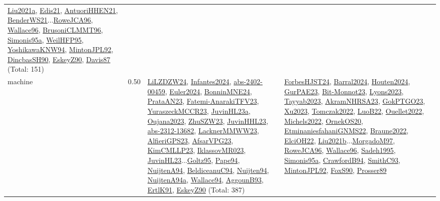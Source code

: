 {\begin{longtable}{p{3cm}r>{\raggedright\arraybackslash}p{6cm}>{\raggedright\arraybackslash}p{6cm}>{\raggedright\arraybackslash}p{8cm}}
\hyperref[detail:Liu2021a]{Liu2021a}, \hyperref[detail:Edis21]{Edis21}, \hyperref[detail:AntuoriHHEN21]{AntuoriHHEN21}, \hyperref[detail:BenderWS21]{BenderWS21}...\hyperref[detail:RoweJCA96]{RoweJCA96}, \hyperref[detail:Wallace96]{Wallace96}, \hyperref[detail:BrusoniCLMMT96]{BrusoniCLMMT96}, \hyperref[detail:Simonis95a]{Simonis95a}, \hyperref[detail:WeilHFP95]{WeilHFP95}, \hyperref[detail:YoshikawaKNW94]{YoshikawaKNW94}, \hyperref[detail:MintonJPL92]{MintonJPL92}, \hyperref[detail:DincbasSH90]{DincbasSH90}, \hyperref[detail:EskeyZ90]{EskeyZ90}, \hyperref[detail:Davis87]{Davis87} (Total: 151)\\
\index{machine}\index{Scheduling!machine}machine &  0.50 & \hyperref[detail:LiLZDZW24]{LiLZDZW24}, \hyperref[detail:Infantes2024]{Infantes2024}, \hyperref[detail:abs-2402-00459]{abs-2402-00459}, \hyperref[detail:Euler2024]{Euler2024}, \hyperref[detail:BonninMNE24]{BonninMNE24}, \hyperref[detail:PrataAN23]{PrataAN23}, \hyperref[detail:Fatemi-AnarakiTFV23]{Fatemi-AnarakiTFV23}, \hyperref[detail:YuraszeckMCCR23]{YuraszeckMCCR23}, \hyperref[detail:JuvinHL23a]{JuvinHL23a}, \hyperref[detail:Oujana2023]{Oujana2023}, \hyperref[detail:ZhuSZW23]{ZhuSZW23}, \hyperref[detail:JuvinHHL23]{JuvinHHL23}, \hyperref[detail:abs-2312-13682]{abs-2312-13682}, \hyperref[detail:LacknerMMWW23]{LacknerMMWW23}, \hyperref[detail:AlfieriGPS23]{AlfieriGPS23}, \hyperref[detail:AfsarVPG23]{AfsarVPG23}, \hyperref[detail:KimCMLLP23]{KimCMLLP23}, \hyperref[detail:IklassovMR023]{IklassovMR023}, \hyperref[detail:JuvinHL23]{JuvinHL23}...\hyperref[detail:Goltz95]{Goltz95}, \hyperref[detail:Pape94]{Pape94}, \hyperref[detail:NuijtenA94]{NuijtenA94}, \hyperref[detail:BeldiceanuC94]{BeldiceanuC94}, \hyperref[detail:Nuijten94]{Nuijten94}, \hyperref[detail:NuijtenA94a]{NuijtenA94a}, \hyperref[detail:Wallace94]{Wallace94}, \hyperref[detail:AggounB93]{AggounB93}, \hyperref[detail:ErtlK91]{ErtlK91}, \hyperref[detail:EskeyZ90]{EskeyZ90} (Total: 387) & \hyperref[detail:ForbesHJST24]{ForbesHJST24}, \hyperref[detail:Barral2024]{Barral2024}, \hyperref[detail:Houten2024]{Houten2024}, \hyperref[detail:GurPAE23]{GurPAE23}, \hyperref[detail:Bit-Monnot23]{Bit-Monnot23}, \hyperref[detail:Lyons2023]{Lyons2023}, \hyperref[detail:Tayyab2023]{Tayyab2023}, \hyperref[detail:AkramNHRSA23]{AkramNHRSA23}, \hyperref[detail:GokPTGO23]{GokPTGO23}, \hyperref[detail:Xu2023]{Xu2023}, \hyperref[detail:Tomczak2022]{Tomczak2022}, \hyperref[detail:LuoB22]{LuoB22}, \hyperref[detail:Ouellet2022]{Ouellet2022}, \hyperref[detail:Michels2022]{Michels2022}, \hyperref[detail:OrnekOS20]{OrnekOS20}, \hyperref[detail:EtminaniesfahaniGNMS22]{EtminaniesfahaniGNMS22}, \hyperref[detail:Braune2022]{Braune2022}, \hyperref[detail:ElciOH22]{ElciOH22}, \hyperref[detail:Liu2021b]{Liu2021b}...\hyperref[detail:MorgadoM97]{MorgadoM97}, \hyperref[detail:RoweJCA96]{RoweJCA96}, \hyperref[detail:Wallace96]{Wallace96}, \hyperref[detail:Sadeh1995]{Sadeh1995}, \hyperref[detail:Simonis95a]{Simonis95a}, \hyperref[detail:CrawfordB94]{CrawfordB94}, \hyperref[detail:SmithC93]{SmithC93}, \hyperref[detail:MintonJPL92]{MintonJPL92}, \hyperref[detail:FoxS90]{FoxS90}, \hyperref[detail:Prosser89]{Prosser89} 
\end{longtable}}
